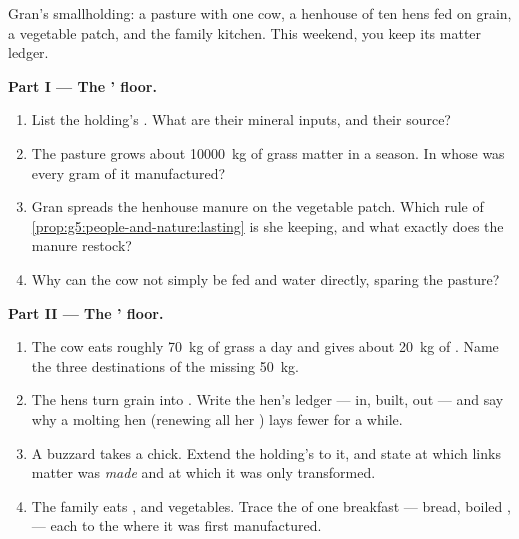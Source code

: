 \begin{problem}\label{pb:g6:matter-from-food:1}
Gran's smallholding: a pasture with one cow, a henhouse of
ten hens fed on grain, a vegetable patch, and the family
kitchen. This weekend, you keep its matter ledger.

\medskip\noindent\textbf{Part I --- The ' floor.}
\begin{enumerate}
  \item List the holding's . What are their
        mineral inputs, and their  source?
  \item The pasture grows about \qty{10000}{kg} of grass
        matter in a season. In whose  was every gram
        of it manufactured?
  \item Gran spreads the henhouse manure on the vegetable
        patch. Which rule of
        \cref{prop:g5:people-and-nature:lasting} is she
        keeping, and what exactly does the manure restock?
  \item Why can the cow not simply be fed 
        and water directly, sparing the pasture?
\end{enumerate}

\medskip\noindent\textbf{Part II --- The ' floor.}
\begin{enumerate}[resume]
  \item The cow eats roughly \qty{70}{kg} of grass a day
        and gives about \qty{20}{kg} of . Name the
        three destinations of the missing \qty{50}{kg}.
  \item The hens turn grain into . Write the hen's
        ledger --- in, built, out --- and say why a molting
        hen (renewing all her ) lays fewer  for
        a while.
  \item A buzzard takes a chick. Extend the holding's  to it, and state at which links matter was
        \emph{made} and at which it was only transformed.
  \item The family eats ,  and vegetables. Trace
        the  of one breakfast --- bread,
        boiled ,  --- each to the  where it was
        first manufactured.
\end{enumerate}


\end{problem}

